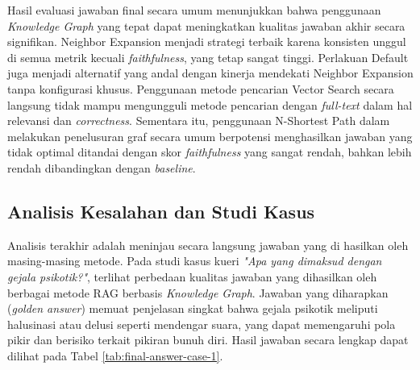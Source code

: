 Hasil evaluasi jawaban final secara umum menunjukkan bahwa penggunaan \textit{Knowledge Graph} yang tepat dapat meningkatkan kualitas jawaban akhir secara signifikan.
Neighbor Expansion menjadi strategi terbaik karena konsisten unggul di semua metrik kecuali \textit{faithfulness}, yang tetap sangat tinggi.
Perlakuan Default juga menjadi alternatif yang andal dengan kinerja mendekati Neighbor Expansion tanpa konfigurasi khusus.
Penggunaan metode pencarian Vector Search secara langsung tidak mampu mengungguli metode pencarian dengan \textit{full-text} dalam hal relevansi dan \textit{correctness}.
Sementara itu, penggunaan N-Shortest Path dalam melakukan penelusuran graf secara umum berpotensi menghasilkan jawaban yang tidak optimal ditandai dengan skor \textit{faithfulness} yang sangat rendah, bahkan lebih rendah dibandingkan dengan \textit{baseline}.

\subsection{Analisis Kesalahan dan Studi Kasus}

Analisis terakhir adalah meninjau secara langsung jawaban yang di hasilkan oleh masing-masing metode.
Pada studi kasus kueri \textit{"Apa yang dimaksud dengan gejala psikotik?"}, terlihat perbedaan kualitas jawaban yang dihasilkan oleh berbagai metode RAG berbasis \textit{Knowledge Graph}.
Jawaban yang diharapkan (\textit{golden answer}) memuat penjelasan singkat bahwa gejala psikotik meliputi halusinasi atau delusi seperti mendengar suara, yang dapat memengaruhi pola pikir dan berisiko terkait pikiran bunuh diri.
Hasil jawaban secara lengkap dapat dilihat pada Tabel \ref{tab:final-answer-case-1}.

